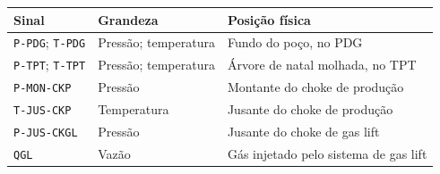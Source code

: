 \begin{tabularx}{\textwidth}{@{}p{3.1cm}p{3.2cm}X@{}}
\toprule
Sinal & Grandeza & Posição física \\
\midrule
\texttt{P-PDG}; \texttt{T-PDG} & Pressão; temperatura & Fundo do poço, no PDG \\
\texttt{P-TPT}; \texttt{T-TPT} & Pressão; temperatura & Árvore de natal molhada, no TPT \\
\texttt{P-MON-CKP} & Pressão & Montante do choke de produção \\
\texttt{T-JUS-CKP} & Temperatura & Jusante do choke de produção \\
\texttt{P-JUS-CKGL} & Pressão & Jusante do choke de gas lift \\
\texttt{QGL} & Vazão & Gás injetado pelo sistema de gas lift \\
\bottomrule
\end{tabularx}
